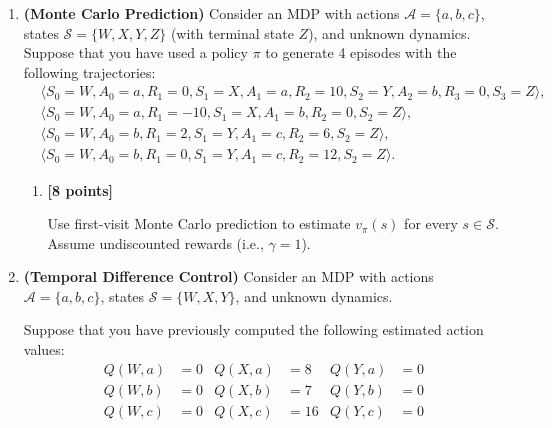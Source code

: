 \documentclass{article}
\newcounter{totalpoints}
\newcommand{\points}[1]{{\addtocounter{totalpoints}{#1}\textbf{[#1 points]}}}
\begin{document}
\begin{enumerate}
\begin{enumerate}
    \item\points{8}
    Construct a policy $\pi'$ that strictly improves upon $\pi$: That is, $v_{\pi'}(s) \ge v_\pi(s)$ for all $s\in\mathcal{S}$, and $v_{\pi'}(s) > v_\pi(s)$ for at least one $s \in \mathcal{S}$.  Appeal to the Policy Improvement Theorem to show that your new policy is indeed a strict improvement.
    \begin{answer}{1.5in}
    \end{answer}
\end{enumerate}

\item \textbf{(Monte Carlo Prediction)}
Consider an MDP with actions $\mathcal{A}=\{a,b,c\}$, states $\mathcal{S}=\{W,X,Y,Z\}$ (with terminal state $Z$), and unknown dynamics.
Suppose that you have used a policy $\pi$ to generate 4 episodes with the following trajectories:
\begin{align*}
    &\langle S_0=W, A_0=a, R_1=0, S_1=X, A_1=a, R_2=10, S_2=Y, A_2=b, R_3=0, S_3=Z\rangle,\\
    &\langle S_0=W, A_0=a, R_1=-10, S_1=X, A_1=b, R_2=0, S_2=Z\rangle,\\
    &\langle S_0=W, A_0=b, R_1=2, S_1=Y, A_1=c, R_2=6, S_2=Z\rangle,\\
    &\langle S_0=W, A_0=b, R_1=0, S_1=Y, A_1=c, R_2=12, S_2=Z\rangle.
\end{align*}
\begin{enumerate}
    \item \points{8}
    Use first-visit Monte Carlo prediction to estimate $v_\pi(s)$ for every $s\in\mathcal{S}$.  Assume undiscounted rewards (i.e., $\gamma=1$).

    \begin{answer}{1.5in}
    \end{answer}
\end{enumerate}

\item \textbf{(Temporal Difference Control)}
Consider an MDP with actions $\mathcal{A}=\{a,b,c\}$, states $\mathcal{S}=\{W,X,Y\}$, and unknown dynamics.

Suppose that you have previously computed the following estimated action values:
\begin{align*}
    Q(W,a) &= 0  &  Q(X,a) &= 8   &      Q(Y,a) &= 0  \\
    Q(W,b) &= 0  &  Q(X,b) &= 7   &      Q(Y,b) &= 0  \\
    Q(W,c) &= 0  &  Q(X,c) &= 16  &      Q(Y,c) &= 0  \\
\end{align*}


\end{enumerate}
\end{document}
